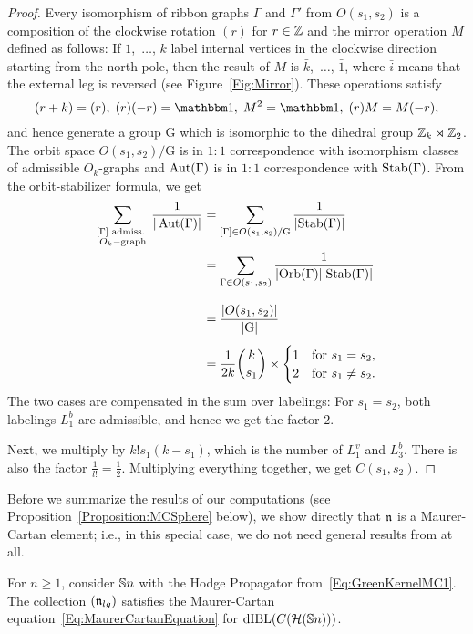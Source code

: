 \documentclass[\MainFolder/Text.tex]{subfiles}
\begin{document}
\begin{proof}
Every isomorphism of ribbon graphs $\Gamma$ and $\Gamma'$ from $O(s_1,s_2)$ is a composition of the clockwise rotation $(r)$ for $r\in \mathbb{Z}$ and the mirror operation $M$ defined as follows: If $1$,~$\dotsc$, $k$ label internal vertices in the clockwise direction starting from the north-pole, then the result of $M$ is $\bar{k}$,~$\dotsc$, $\bar{1}$, where $\bar{i}$ means that the external leg is reversed (see Figure~\ref{Fig:Mirror}). These operations satisfy
\[ (r+k) = (r),\; (r)(-r)=\Id,\; M^2 = \Id,\; (r)M = M(-r), \]
and hence generate a group $\mathrm{G}$ which is isomorphic to the dihedral group $\mathbb{Z}_k \rtimes \mathbb{Z}_2$. The orbit space $O(s_1,s_2)/\mathrm{G}$ is in $1:1$ correspondence with isomorphism classes of admissible $O_k$-graphs and $\operatorname{Aut}(\Gamma)$ is in $1:1$ correspondence with $\mathrm{Stab}(\Gamma)$. From the orbit-stabilizer formula, we get
\begin{align*}
\sum_{\substack{[\Gamma] \text{ admiss. }\\O_k-\text{graph}}} \frac{1}{|\operatorname{Aut}(\Gamma)|} &= \sum_{[\Gamma]\in O(s_1,s_2)/\mathrm{G}} \frac{1}{|\mathrm{Stab}(\Gamma)|} \\
& = \sum_{\Gamma\in O(s_1,s_2)} \frac{1}{|\mathrm{Orb}(\Gamma)||\mathrm{Stab}(\Gamma)|} \\[2ex]
&= \frac{|O(s_1,s_2)|}{|\mathrm{G}|}\\[1ex] 
&= \frac{1}{2k}{\binom{k}{s_1}}\times\begin{cases} 1 & \text{for }s_1=s_2, \\ 2 & \text{for }s_1\neq s_2.\end{cases}
\end{align*}
The two cases are compensated in the sum over labelings: For $s_1=s_2$, both labelings $L_1^b$ are admissible, and hence we get the factor $2$.

Next, we multiply by $k! s_1(k-s_1)$, which is the number of $L_1^v$ and $L_3^b$. There is also the factor $\frac{1}{l!} = \frac{1}{2}$. Multiplying everything together, we get $C(s_1,s_2)$.
\end{proof}

Before we summarize the results of our computations (see Proposition~\ref{Proposition:MCSphere} below), we show directly that $\mathfrak{n}$ is a Maurer-Cartan element; i.e., in this special case, we do not need general results from \cite{Cieliebak2018} at all.

\begin{Lemma} \label{Lem:MCEquation}
For $n\ge 1$, consider $\mathbb{S}{n}$ with the Hodge Propagator from~\eqref{Eq:GreenKernelMC1}. The collection $(\mathfrak{n}_{lg})$ satisfies the Maurer-Cartan equation~\eqref{Eq:MaurerCartanEquation} for $\mathrm{dIBL}(C(\mathcal{H}(\mathbb{S}{n})))$.
\end{Lemma}
\end{document}
